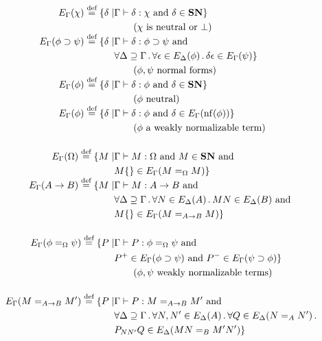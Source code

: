 \newcommand{\ldot}{\, . \,}
\begin{definition}
\label{df:computable}
\begin{align*}
E_\Gamma(\chi) \eqdef \{ \delta \mid & \Gamma \vdash \delta : \chi\text{ and } \delta \in \SN \} \\
& \qquad (\chi \text{ is neutral or } \bot) \\
E_\Gamma(\phi \supset \psi) \eqdef \{ \delta \mid & \Gamma \vdash \delta : \phi \supset \psi\text{ and } \\
& \forall \Delta \supseteq \Gamma \ldot \forall \epsilon \in E_\Delta(\phi)\ldot \delta \epsilon \in E_\Gamma(\psi) \} \\
& \qquad (\phi , \psi \text{ normal forms}) \\
E_\Gamma(\phi) \eqdef \{ \delta \mid & \Gamma \vdash \delta : \phi\text{ and } \delta \in \SN \} \\
& \qquad (\phi \text{ neutral}) \\
E_\Gamma(\phi) \eqdef \{ \delta \mid & \Gamma \vdash \delta : \phi\text{ and } \delta \in E_\Gamma(\nf{\phi}) \} \\
& \qquad (\phi \text{ a weakly normalizable term}) \\
\\
E_\Gamma(\Omega) \eqdef \{ M \mid & \Gamma \vdash M : \Omega\text{ and } M \in \SN\text{ and } \\
& M \{\} \in E_\Gamma(M =_\Omega M) \} \\
E_\Gamma(A \rightarrow B) \eqdef \{ M \mid & \Gamma \vdash M : A \rightarrow B\text{ and } \\
& \forall \Delta \supseteq \Gamma\ldot \forall N \in E_\Delta(A)\ldot MN \in E_\Delta(B)\text{ and } \\
& M \{\} \in E_\Gamma(M =_{A \rightarrow B} M) \} \\
\\
E_\Gamma(\phi =_\Omega \psi) \eqdef \{ P \mid & \Gamma \vdash P : \phi =_\Omega \psi\text{ and } \\
& P^+ \in E_\Gamma(\phi \supset \psi)\text{ and } P^- \in E_\Gamma(\psi \supset \phi) \} \\
& \qquad (\phi , \psi \text{ weakly normalizable terms}) \\
\\
E_\Gamma(M =_{A \rightarrow B} M') \eqdef \{ P \mid & \Gamma \vdash P : M =_{A \rightarrow B} M'\text{ and } \\
& \forall \Delta \supseteq \Gamma\ldot \forall N, N' \in E_\Delta(A)\ldot \forall Q \in E_\Delta(N =_A N')\ldot \\
& P_{NN'}Q \in E_\Delta(MN =_B M'N') \}
\end{align*}
\end{definition}

